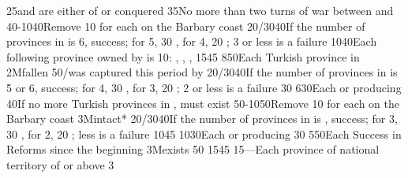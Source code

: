 %
%
{}{25}{\paysvalachie and \paysmoldavie are either \VASSAL of \TUR or
  conquered}%
%
%
%
{}{35}{No more than two turns of war between \AUSaus and \TUR}%
%
%
{40-10}{40}{Remove 10 \VPs for each \Presidio on the Barbary coast}%
%
%
{20/30}{40}{If the number of provinces in \payscrimee is 6, success; for 5, 30
  \VPs, for 4, 20 \VPs; 3 or less is a failure}%
%
%
{10}{40}{Each following province owned by \TUR is 10\VPs: \provinceCorfou,
  \provinceKreta, \provinceMalta, \provinceChypre}%
%
%
{15}{45}{\EUobjMonopolyZone}%
%
%
%
{8}{50}{Each Turkish province in \payshongrie}%
%
\EUobjective2M{\villeVienne fallen}{}%
{}{50}{\provinceOsterreich/\villeVienne was captured this period by \TUR}%
%
%
{20/30}{40}{If the number of provinces in \payscrimee is 5 or 6, success; for
  4, 30 \VPs, for 3, 20 \VPs; 2 or less is a failure}%
%
%
{}{30}{}%
%
%
{6}{30}{Each \COL or \TP producing \POSPICE}%
%
%
%
%
{}{40}{If no more Turkish provinces in \payshongrie, \paystransylvanie must
  exist}%
%
%
%
{50-10}{50}{Remove 10 \VPs for each \Presidio on the Barbary coast}%
%
\EUobjective3M{\payscrimee intact*}{}%
{20/30}{40}{If the number of provinces in \payscrimee is , success; for
  3, 30 \VPs, for 2, 20 \VPs; less is a failure}%
%
%
{10}{45}{}%
%
%
{10}{30}{Each \COL or \TP producing \POSPICE}%
%
%
%
{}{30}{}%
%
%
{5}{50}{Each Success in Reforms since the beginning}%
%
\EUobjective3M{\payscrimee exists}{}%
{}{50}{}%
%
%
{15}{45}{}%
%
%
{15}{---}{Each province of national territory of  or
   above 3}%
%
 
